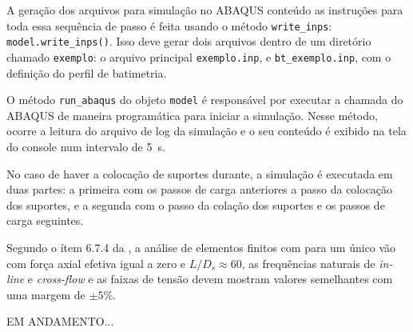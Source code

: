 A geração dos arquivos para simulação no ABAQUS conteúdo as instruções para toda essa sequência de passo é feita usando o método \texttt{write\_inps}: \texttt{model.write\_inps()}.
Isso deve gerar dois arquivos dentro de um diretório chamado \texttt{exemplo}: o arquivo principal \texttt{exemplo.inp}, e \texttt{bt\_exemplo.inp}, com o definição do perfil de batimetria. \par

O método \texttt{run\_abaqus} do objeto \texttt{model} é responsável por executar a chamada do ABAQUS de maneira programática para iniciar a simulação.
Nesse método, ocorre a leitura do arquivo de log da simulação e o seu conteúdo é exibido na tela do console num intervalo de 5~s.

No caso de haver a colocação de suportes durante, a simulação é executada em duas partes: a primeira com os passos de carga anteriores a passo da colocação dos suportes, e a segunda com o passo da colação dos suportes e os passos de carga seguintes.

Segundo o ítem 6.7.4 da , a análise de elementos finitos com para um único vão com força axial efetiva igual a zero e $L / D_s \approx 60$, as frequências naturais de \textit{in-line} e \textit{cross-flow} e as faixas de tensão devem mostram valores semelhantes com uma margem de $\pm 5\%$.

{\large EM ANDAMENTO...}
